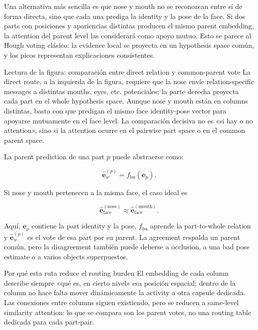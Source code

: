 Una alternativa más sencilla es que nose y mouth no se reconozcan entre sí de forma directa, sino que cada una prediga la identity y la pose de la face. Si dos parts con posiciones y apariencias distintas producen el mismo parent embedding, la attention del parent level las considerará como apoyo mutuo. Esto se parece al Hough voting clásico: la evidence local se proyecta en un hypothesis space común, y los picos representan explicaciones consistentes.


\begin{knowledgebox}{Lectura de la figura: comparación entre direct relation y common-parent vote}
La direct route, a la izquierda de la figura, requiere que la nose envíe relation-specific messages a distintas mouths, eyes, etc. potenciales; la parte derecha proyecta cada part en el whole hypothesis space. Aunque nose y mouth están en columns distintas, basta con que predigan el mismo face identity-pose vector para apoyarse mutuamente en el face level. La comparación decisiva no es «si hay o no attention», sino si la attention ocurre en el pairwise part space o en el common parent space.
\end{knowledgebox}

La parent prediction de una part $p$ puede abstraerse como:

\[
\hat{\mathbf e}_{w}^{(p)}=f_{\mathrm{bu}}\!\left(\mathbf e_p\right).
\]

Si nose y mouth pertenecen a la misma face, el caso ideal es

\[
\hat{\mathbf e}_{\mathrm{face}}^{(\mathrm{nose})}
\approx
\hat{\mathbf e}_{\mathrm{face}}^{(\mathrm{mouth})}.
\]

Aquí, $\mathbf e_p$ contiene la part identity y la pose, $f_{\mathrm{bu}}$ aprende la part-to-whole relation y $\hat{\mathbf e}_w^{(p)}$ es el vote de esa part por su parent. La agreement respalda un parent común, pero la disagreement también puede deberse a occlusion, a una bad pose estimate o a varios objects superpuestos.

\begin{importantbox}{Por qué esta ruta reduce el routing burden}
El embedding de cada column describe siempre «qué es, en cierto nivel» esa posición espacial; dentro de la column no hace falta mover dinámicamente la activity a otra capsule dedicada. Las conexiones entre columns siguen existiendo, pero se reducen a same-level similarity attention: lo que se compara son los parent votes, no una routing table dedicada para cada part-pair.
\end{importantbox}

